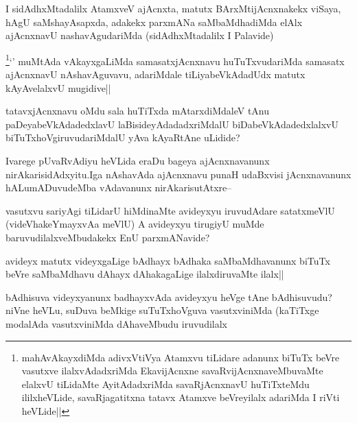 
\begin{artha}
I sidAdhxMtadalilx AtamxveV ajAcnxta, matutx BArxMtijAcnxnakekx viSaya, hAgU saMshayAsapxda, adakekx parxmANa saMbaMdhadiMda elAlx ajAcnxnavU nashavAgudariMda (sidAdhxMtadalilx I Palavide)
\end{artha}

\begin{artha}
\footnote{mahAvAkayxdiMda adivxVtiVya Atamxvu tiLidare adanunx biTuTx beVre vasutxve ilalxvAdadxriMda EkavijAcnxne savaRvijAcnxnaveMbuvaMte elalxvU tiLidaMte AyitAdadxriMda savaRjAcnxnavU huTiTxteMdu ililxheVLide, savaRjagatitxna tatavx Atamxve beVreyilalx adariMda I riVti heVLide||}`\stext' muMtAda vAkayxgaLiMda samasatxjAcnxnavu huTuTxvudariMda samasatx ajAcnxnavU nAshavAguvavu, adariMdale tiLiyabeVkAdadUdx matutx kAyAvelalxvU mugidive||
\end{artha}


\begin{artha}
tatavxjAcnxnavu oMdu sala huTiTxda mAtarxdiMdaleV tAnu paDeyabeVkAdadedxlavU laBisideyAdadadxriMdalU biDabeVkAdadedxlalxvU biTuTxhoVgiruvudariMdalU yAva kAyaRtAne uLidide?
\end{artha}

\begin{artha}
Ivarege pUvaRvAdiyu heVLida eraDu bageya ajAcnxnavanunx nirAkarisidAdxyitu.Iga nAshavAda ajAcnxnavu  punaH udaBxvisi jAcnxnavanunx hALumADuvudeMba vAdavanunx nirAkarisutAtxre--
\end{artha}

\begin{artha}
vasutxvu sariyAgi tiLidarU hiMdinaMte avideyxyu iruvudAdare satatxmeVlU (videVhakeYmayxvAa meVlU) A avideyxyu tirugiyU muMde baruvudilalxveMbudakekx EnU parxmANavide?
\end{artha}

\begin{artha}
avideyx matutx videyxgaLige bAdhayx bAdhaka saMbaMdhavanunx biTuTx beVre saMbaMdhavu dAhayx dAhakagaLige ilalxdiruvaMte ilalx||
\end{artha}


\begin{artha}
bAdhisuva videyxyanunx badhayxvAda avideyxyu heVge tAne bAdhisuvudu? niVne heVLu, suDuva beMkige suTuTxhoVguva vasutxviniMda (kaTiTxge modalAda vasutxviniMda dAhaveMbudu iruvudilalx
\end{artha}

